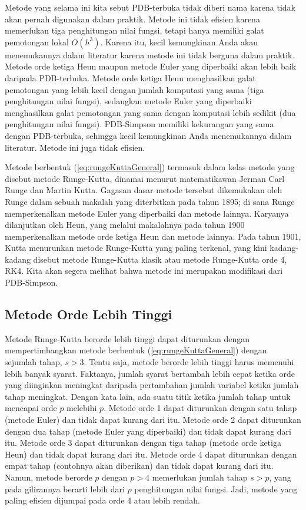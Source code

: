 Metode yang selama ini kita sebut PDB-terbuka tidak diberi nama karena
tidak akan pernah digunakan dalam praktik. Metode ini tidak efisien
karena memerlukan tiga penghitungan nilai fungsi, tetapi hanya memiliki
galat pemotongan lokal $O(h^{3})$. Karena itu, kecil kemungkinan
Anda akan menemukannya dalam literatur karena metode ini tidak berguna
dalam praktik. Metode orde ketiga Heun maupun metode Euler yang diperbaiki
akan lebih baik daripada PDB-terbuka. Metode orde ketiga Heun menghasilkan
galat pemotongan yang lebih kecil dengan jumlah komputasi yang sama
(tiga penghitungan nilai fungsi), sedangkan metode Euler yang diperbaiki
menghasilkan galat pemotongan yang sama dengan komputasi lebih sedikit
(dua penghitungan nilai fungsi). PDB-Simpson memiliki kekurangan yang
sama dengan PDB-terbuka, sehingga kecil kemungkinan Anda menemukannya
dalam literatur. Metode ini juga tidak efisien.

Metode berbentuk (\ref{eq:rungeKuttaGeneral}) termasuk dalam kelas
metode yang disebut metode Runge-Kutta, dinamai menurut matematikawan
Jerman Carl Runge dan Martin Kutta.
Gagasan dasar metode tersebut dikemukakan oleh Runge dalam sebuah
makalah yang diterbitkan pada tahun 1895; di sana Runge memperkenalkan
metode Euler yang diperbaiki dan metode lainnya. Karyanya dilanjutkan
oleh Heun, yang melalui makalahnya pada tahun 1900
memperkenalkan metode orde ketiga Heun dan metode lainnya. Pada tahun
1901, Kutta menurunkan metode Runge-Kutta yang paling terkenal, yang
kini kadang-kadang disebut metode Runge-Kutta klasik atau metode Runge-Kutta
orde 4, RK4. Kita akan segera melihat bahwa metode ini merupakan modifikasi
dari PDB-Simpson.\cite{butcher}

\subsection{Metode Orde Lebih Tinggi}

Metode Runge-Kutta berorde lebih tinggi dapat diturunkan dengan mempertimbangkan
metode berbentuk (\ref{eq:rungeKuttaGeneral}) dengan sejumlah tahap,
$s>3$. Tentu saja, metode berorde lebih tinggi harus memenuhi lebih
banyak syarat. Faktanya, jumlah syarat bertambah lebih cepat ketika
orde yang diinginkan meningkat daripada pertambahan jumlah variabel
ketika jumlah tahap meningkat. Dengan kata lain, ada suatu titik ketika
jumlah tahap untuk mencapai orde $p$ melebihi $p$. Metode orde 1
dapat diturunkan dengan satu tahap (metode Euler) dan tidak dapat
kurang dari itu. Metode orde 2 dapat diturunkan dengan dua tahap (metode
Euler yang diperbaiki) dan tidak dapat kurang dari itu. Metode orde
3 dapat diturunkan dengan tiga tahap (metode orde ketiga Heun) dan
tidak dapat kurang dari itu. Metode orde 4 dapat diturunkan dengan
empat tahap (contohnya akan diberikan) dan tidak dapat kurang dari
itu. Namun, metode berorde $p$ dengan $p>4$ memerlukan jumlah tahap
$s>p$, yang pada gilirannya berarti lebih dari $p$ penghitungan
nilai fungsi. Jadi, metode yang paling efisien dijumpai pada orde
4 atau lebih rendah.

